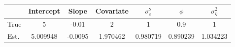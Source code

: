 \begin{tabular}{lcccccc}
\toprule
& Intercept & Slope & Covariate & $\sigma_\varepsilon^2$ & $\phi$ & $\sigma_\eta^2$ \\
\midrule
True & 5 & -0.01 & 2 & 1 & 0.9 & 1 \\
\midrule
Est. & 5.009948 & -0.0095 & 1.970462 & 0.980719 & 0.890239 & 1.034223 \\
\bottomrule
\end{tabular}
